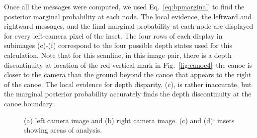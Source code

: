 Once all the messages were computed, we used Eq.~\ref{eq:bpmarginal} to find the posterior marginal probability at each node.  The local evidence, the leftward and rightward messages, and the final marginal probability at each node are displayed for every left-camera pixel of the inset.  The four rows of each display in subimages (c)-(f) correspond to the four possible depth states used for this calculation. 
Note that for this scanline, in this image pair, there is a depth discontinuity at location of the red vertical mark in Fig.~\ref{fig:canoe4}--the canoe is closer to the camera than the ground beyond the canoe that appears to the right of the canoe.  The local evidence for depth disparity, (c), is rather inaccurate, but the marginal posterior probability accurately finds the depth discontinuity at the canoe boundary.

\begin{figure}
\centerline{
}
\centerline{
}
\caption{(a) left camera image and (b) right camera image. (c) and (d): insets showing areas of analysis.}
\label{fig:canoe1}
\end{figure}

